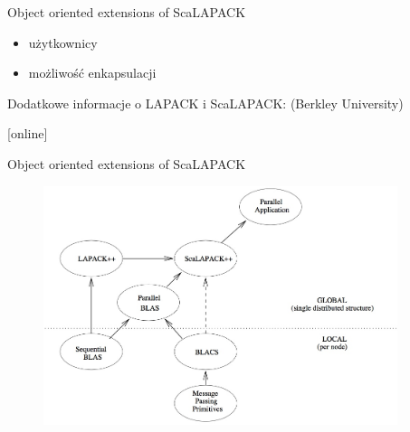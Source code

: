 	\begin{frame}{Object oriented extensions of ScaLAPACK}
		\begin{itemize}
			\item użytkownicy
			\item możliwość enkapsulacji
		\end{itemize}
		Dodatkowe informacje o LAPACK i ScaLAPACK: (Berkley University)
		\begin{thebibliography}{9}
		\end{thebibliography}
	\end{frame}
	\begin{frame}{Object oriented extensions of ScaLAPACK}
		\begin{figure}
			\includegraphics[height=7cm]{img/13/scalapackextensions}
		\end{figure}
	\end{frame}